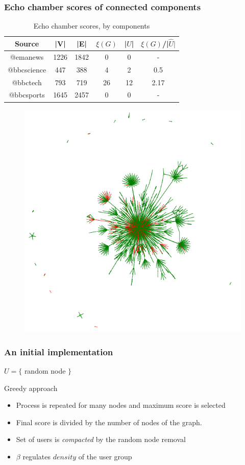 \documentclass{beamer}
\begin{document}
\begin{frame}[c]
    \frametitle{Echo chamber scores of connected components}
    \begin{table}[htpb]
        \centering
        \caption{Echo chamber scores, by components}
        \begin{tabular}{c|c|c|c|c|c}
            \textbf{Source} & {|V|} & {|E|} & {$\xi(G)$} &
            {|$\hat{U}$|} & $\xi(G)$/{|$\hat{U}|$} \\
            \hline
            @emanews & 1226 & 1842 & 0 & 0 & - \\
            @bbcscience & 447 & 388 & 4 & 2 & 0.5 \\
            @bbctech & 793 & 719 & 26 & 12 & 2.17 \\
            @bbcsports & 1645 & 2457 & 0 & 0 & - \\
        \end{tabular}
    \end{table}

    \begin{figure}[htpb]
        \centering
        \includegraphics[width=0.3\linewidth]{img/graph.png}
        \label{fig:img/graph}
    \end{figure}

\end{frame}

\begin{frame}[c]
    \frametitle{An initial implementation}

    \begin{algorithm}[H]
        \SetAlgoLined
        $U = \{$ random node $\}$\;
        \caption{Greedy approach}
    \end{algorithm}

    \begin{itemize}
        \item Process is repeated for many nodes and maximum score is selected
        \item Final score is divided by the number of nodes of the graph.
        \item Set of users is \textit{compacted} by the random node removal
        \item $\beta $  regulates $density$ of the user group
    \end{itemize}

\end{frame}
\end{document}
